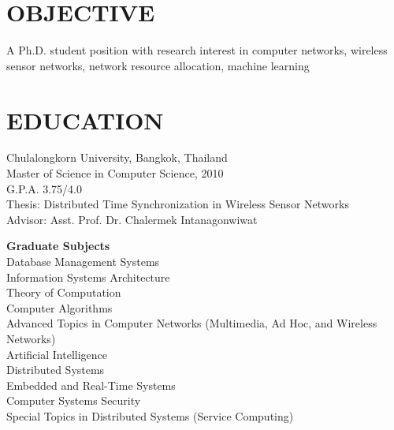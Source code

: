 \documentclass[margin]{res}
\begin{document}
  

\address{ 7/639 Vibhavadee-Rangsit Rd. \\   Chatuchak, Bangkok, 10900 \\   (66)-081-343-3188 }
                           
                        
\begin{resume}                        
 
\section{OBJECTIVE}       A Ph.D. student position with research interest in computer networks, wireless sensor networks, network resource allocation, machine learning
 
\section{EDUCATION}       Chulalongkorn University, Bangkok, Thailand \\
                Master of Science in Computer Science, 2010 \\
                G.P.A. 3.75/4.0 \\
                Thesis: Distributed Time Synchronization in Wireless Sensor Networks \\
                Advisor: Asst. Prof. Dr. Chalermek Intanagonwiwat
 
                \begin{ncolumn}{1}
                {\bf Graduate Subjects}    \\
                Database Management Systems   \\
                Information Systems Architecture  \\
                Theory of Computation        \\
                Computer Algorithms               \\
                Advanced Topics in Computer Networks (Multimedia, Ad Hoc, and Wireless Networks)   \\
                Artificial Intelligence  \\
                Distributed Systems \\
                Embedded and Real-Time Systems \\
                Computer Systems Security \\
                Special Topics in Distributed Systems (Service Computing) \\
				\end{ncolumn}
		

\end{resume}
\end{document}
